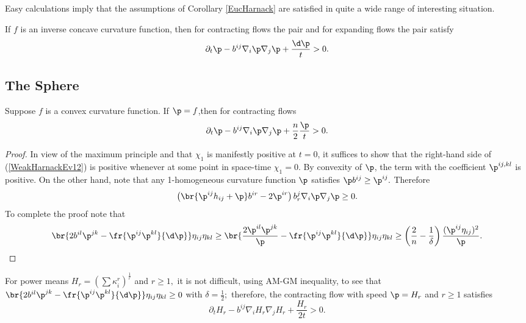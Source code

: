 \documentclass[12pt]{amsart}
\begin{document}
Easy calculations imply that the assumptions of Corollary \ref{EucHarnack} are satisfied in quite a wide range of interesting situation.

\begin{corollary}\label{HarnackEucCor}
 If $f$ is an inverse concave curvature function, then for contracting flows the pair
and for expanding flows the pair
satisfy $$\partial_t \p-b^{ij}\nabla_i\p\nabla_j\p+\frac{\d\p}{t}>0.$$
\end{corollary}

\subsection{The Sphere}

\begin{theorem}\label{thm: main A}
Suppose $f$ is a  convex curvature function. If $\p=f$,then for contracting flows
$$\partial_t \p-b^{ij}\nabla_i\p\nabla_j\p+\frac{n}{2}\frac{\p}{t}>0.$$
\end{theorem}
\begin{proof}
In view of the maximum principle and that $\chi_1$ is manifestly positive at $t=0$, it suffices to show that the right-hand side of (\ref{WeakHarnackEv12}) is positive whenever at some point in space-time $\chi_1=0$. By convexity of $\p$, the term with the coefficient $\p^{ij,kl}$ is positive. On the other hand, note that any 1-homogeneous curvature function $\p$ satisfies $\p b^{ij}\geq \p^{ij}.$ Therefore
$$\left(\br{\p^{ij}h_{ij}+\p}b^{ir}-2\p^{ir}\right)b^{j}_{r}\nabla_{i}\p\nabla_{j}\p\ge 0.$$ To complete the proof note that
$$\br{2b^{il}\p^{jk}-\fr{\p^{ij}\p^{kl}}{\d\p}}\eta_{ij}\eta_{kl}\geq \br{\frac{2\p^{il}\p^{jk}}{\p}-\fr{\p^{ij}\p^{kl}}{\d\p}}\eta_{ij}\eta_{kl}\geq \left(\frac{2}{n}-\frac{1}{\delta}\right)\frac{(\p^{ij}\eta_{ij})^2}{\p}.$$
\end{proof}
\begin{remark}
For power means $H_r=\left(\sum \kappa_i^r\right)^{\frac{1}{r}}$ and $r\geq 1,$ it is not difficult, using AM-GM inequality, to see that $\br{2b^{il}\p^{jk}-\fr{\p^{ij}\p^{kl}}{\d\p}}\eta_{ij}\eta_{kl}\geq0$ with $\delta=\frac{1}{2};$ therefore, the contracting flow with speed $\p=H_r$ and $r\geq 1$ satisfies
$$\partial_t H_r-b^{ij}\nabla_iH_r\nabla_jH_r+\frac{H_r}{2t}>0.$$
\end{remark}
\end{document}
